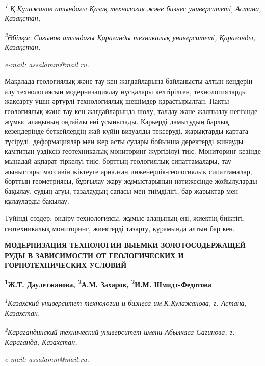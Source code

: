 \begin{affiliation}
\emph{\textsuperscript{1} Қ.Құлажанов атындағы Қазақ технология және бизнес университеті, Астана, Қазақстан,}

\emph{\textsuperscript{2}Әбілқас Сағынов атындағы Қарағанды техникалық университеті, Қарағанды, Қазақстан,}

\emph{e-mail: assalamm@mail.ru.}
\end{affiliation}

Мақалада геологиялық және тау-кен жағдайларына байланысты алтын кендерін
алу технологиясын модернизациялау нұсқалары келтірілген, технологияларды
жақсарту үшін әртүрлі технологиялық шешімдер қарастырылған. Нақты
геологиялық және тау-кен жағдайларында шолу, талдау және жалпылау
негізінде жұмыс алаңының оңтайлы ені ұсынылады. Карьерді дамытудың
барлық кезеңдерінде беткейлердің жай-күйін визуалды тексеруді,
жарықтарды картаға түсіруді, деформациялар мен жер асты сулары бойынша
деректерді жинауды қамтитын үздіксіз геотехникалық мониторинг жүргізілуі
тиіс. Мониторинг кезінде мынадай ақпарат тіркелуі тиіс: борттың
геологиялық сипаттамалары, тау жыныстары массивін жіктеуге арналған
инженерлік-геологиялық сипаттамалар, борттың геометриясы, бұрғылау-жару
жұмыстарының нәтижесінде жойылуларды бақылау, судың ағуы, тазалаудың
сапасы мен тиімділігі, бар жарықтар мен құлауларды бақылау.

Түйінді сөздер: өндіру технологиясы, жұмыс алаңының ені, жиектің
биіктігі, геотехникалық мониторинг, жиектерді тазарту, құрамында алтын
бар кен.

\begin{articleheader}
{\bfseries МОДЕРНИЗАЦИЯ ТЕХНОЛОГИИ ВЫЕМКИ ЗОЛОТОСОДЕРЖАЩЕЙ РУДЫ В ЗАВИСИМОСТИ ОТ ГЕОЛОГИЧЕСКИХ И ГОРНОТЕХНИЧЕСКИХ УСЛОВИЙ}

{\bfseries
\textsuperscript{1}Ж.Т. Даулетжанова,
\textsuperscript{2}А.М. Захаров\textsuperscript{\envelope },
\textsuperscript{2}И.М. Шмидт-Федотова}
\end{articleheader}

\begin{affiliation}
\emph{\textsuperscript{1}Казахский университет технологии и бизнеса им.К.Кулажанова, г. Астана, Казахстан,}

\emph{\textsuperscript{2}Карагандинский технический университет имени Абылкаса Сагинова, г. Караганда, Казахстан,}

\emph{e-mail: assalamm@mail.ru.}
\end{affiliation}

